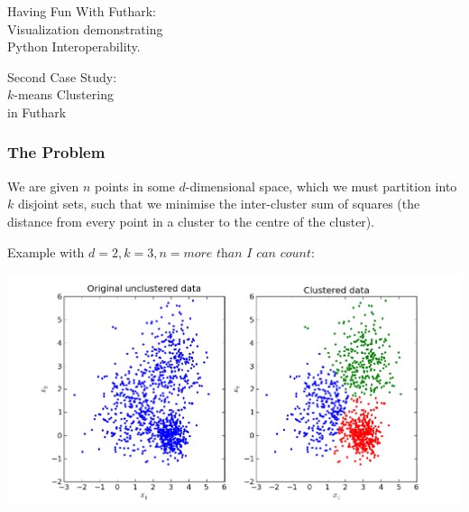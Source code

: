 \documentclass[rgb,dvipsnames]{beamer}
\begin{document}
\begin{frame}
  \begin{center}
    \Huge
    Having Fun With Futhark:\\
    Visualization demonstrating\\
    Python Interoperability.

  \end{center}
\end{frame}


\begin{frame}
  \begin{center}
    \Huge
    Second Case Study:\\$k$-means Clustering\\in Futhark
  \end{center}
\end{frame}

\begin{frame}
  \frametitle{The Problem}

  We are given $n$ points in some $d$-dimensional space, which we must
  partition into $k$ disjoint sets, such that we minimise the
  inter-cluster sum of squares (the distance from every point in a
  cluster to the centre of the cluster).

  Example with $d=2, k=3, n=\textit{more than I can count}$:

  \begin{center}
    \includegraphics[width=50ex]{img/kmeans.png}
  \end{center}
\end{frame}
\end{document}
